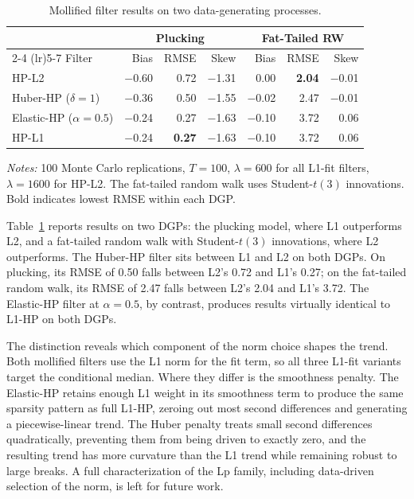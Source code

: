 \documentclass[10pt]{article}
\begin{document}
\begin{table}[htbp]
\centering
\caption{Mollified filter results on two data-generating processes.}
\label{tab:mollified}
\begin{tabular}{l rrr rrr}
\toprule
& \multicolumn{3}{c}{Plucking} & \multicolumn{3}{c}{Fat-Tailed RW} \\
\cmidrule(lr){2-4} \cmidrule(lr){5-7}
Filter & Bias & RMSE & Skew & Bias & RMSE & Skew \\
\midrule
HP-L2                    & $-$0.60 & 0.72 & $-$1.31 &    0.00 & \textbf{2.04} & $-$0.01 \\
Huber-HP ($\delta = 1$)  & $-$0.36 & 0.50 & $-$1.55 & $-$0.02 & 2.47 & $-$0.01 \\
Elastic-HP ($\alpha = 0.5$) & $-$0.24 & 0.27 & $-$1.63 & $-$0.10 & 3.72 &    0.06 \\
HP-L1                    & $-$0.24 & \textbf{0.27} & $-$1.63 & $-$0.10 & 3.72 &    0.06 \\
\bottomrule
\end{tabular}
\begin{tablenotes}
\small
\item \textit{Notes:} 100 Monte Carlo replications, $T = 100$, $\lambda = 600$ for all L1-fit filters, $\lambda = 1600$ for HP-L2. The fat-tailed random walk uses Student-$t(3)$ innovations. Bold indicates lowest RMSE within each DGP.
\end{tablenotes}
\end{table}

Table~\ref{tab:mollified} reports results on two DGPs: the plucking model, where L1 outperforms L2, and a fat-tailed random walk with Student-$t(3)$ innovations, where L2 outperforms. The Huber-HP filter sits between L1 and L2 on both DGPs. On plucking, its RMSE of 0.50 falls between L2's 0.72 and L1's 0.27; on the fat-tailed random walk, its RMSE of 2.47 falls between L2's 2.04 and L1's 3.72. The Elastic-HP filter at $\alpha = 0.5$, by contrast, produces results virtually identical to L1-HP on both DGPs.

The distinction reveals which component of the norm choice shapes the trend. Both mollified filters use the L1 norm for the fit term, so all three L1-fit variants target the conditional median. Where they differ is the smoothness penalty. The Elastic-HP retains enough L1 weight in its smoothness term to produce the same sparsity pattern as full L1-HP, zeroing out most second differences and generating a piecewise-linear trend. The Huber penalty treats small second differences quadratically, preventing them from being driven to exactly zero, and the resulting trend has more curvature than the L1 trend while remaining robust to large breaks. A full characterization of the Lp family, including data-driven selection of the norm, is left for future work.
\end{document}
